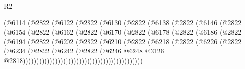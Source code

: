 \begin{lexlean}{R2}
\begin{coremodule}
                        (@6114
                          (@2822
                            (@6122
                              (@2822
                                (@6130
                                  (@2822
                                    (@6138
                                      (@2822
                                        (@6146
                                          (@2822
                                            (@6154
                                              (@2822
                                                (@6162
                                                  (@2822
                                                    (@6170
                                                      (@2822
                                                        (@6178
                                                          (@2822
                                                            (@6186
                                                              (@2822
                                                                (@6194
                                                                  (@2822
                                                                    (@6202
                                                                      (@2822
                                                                        (@6210
                                                                          (@2822
                                                                            (@6218
                                                                              (@2822
                                                                                (@6226
                                                                                  (@2822
                                                                                    (@6234
                                                                                      (@2822
                                                                                        (@6242
                                                                                          (@2822
                                                                                            (@6246
                                                                                              @6248
                                                                                              @3126
                                                                                              @2818)))))))))))))))))))))))))))))))))))))))))))))

\end{coremodule}
\end{lexlean}
